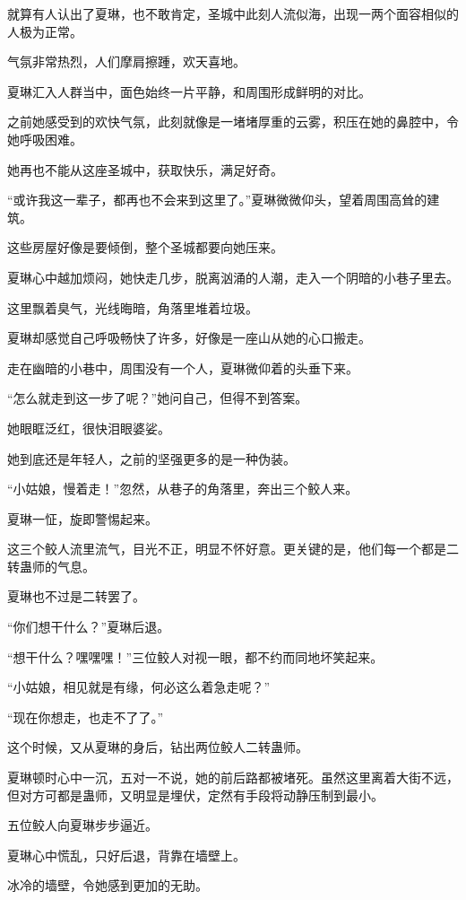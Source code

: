 \begin{this_body}
就算有人认出了夏琳，也不敢肯定，圣城中此刻人流似海，出现一两个面容相似的人极为正常。

气氛非常热烈，人们摩肩擦踵，欢天喜地。

夏琳汇入人群当中，面色始终一片平静，和周围形成鲜明的对比。

之前她感受到的欢快气氛，此刻就像是一堵堵厚重的云雾，积压在她的鼻腔中，令她呼吸困难。

她再也不能从这座圣城中，获取快乐，满足好奇。

“或许我这一辈子，都再也不会来到这里了。”夏琳微微仰头，望着周围高耸的建筑。

这些房屋好像是要倾倒，整个圣城都要向她压来。

夏琳心中越加烦闷，她快走几步，脱离汹涌的人潮，走入一个阴暗的小巷子里去。

这里飘着臭气，光线晦暗，角落里堆着垃圾。

夏琳却感觉自己呼吸畅快了许多，好像是一座山从她的心口搬走。

走在幽暗的小巷中，周围没有一个人，夏琳微仰着的头垂下来。

“怎么就走到这一步了呢？”她问自己，但得不到答案。

她眼眶泛红，很快泪眼婆娑。

她到底还是年轻人，之前的坚强更多的是一种伪装。

“小姑娘，慢着走！”忽然，从巷子的角落里，奔出三个鲛人来。

夏琳一怔，旋即警惕起来。

这三个鲛人流里流气，目光不正，明显不怀好意。更关键的是，他们每一个都是二转蛊师的气息。

夏琳也不过是二转罢了。

“你们想干什么？”夏琳后退。

“想干什么？嘿嘿嘿！”三位鲛人对视一眼，都不约而同地坏笑起来。

“小姑娘，相见就是有缘，何必这么着急走呢？”

“现在你想走，也走不了了。”

这个时候，又从夏琳的身后，钻出两位鲛人二转蛊师。

夏琳顿时心中一沉，五对一不说，她的前后路都被堵死。虽然这里离着大街不远，但对方可都是蛊师，又明显是埋伏，定然有手段将动静压制到最小。

五位鲛人向夏琳步步逼近。

夏琳心中慌乱，只好后退，背靠在墙壁上。

冰冷的墙壁，令她感到更加的无助。


\end{this_body}
